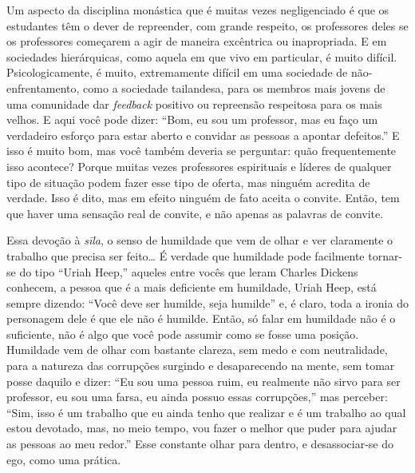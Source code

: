 Um aspecto da disciplina monástica que é muitas vezes negligenciado
é que os estudantes têm o dever de repreender, com grande respeito, os
professores deles se os professores começarem a agir de maneira
excêntrica ou inapropriada. E em sociedades hierárquicas, como aquela
em que vivo em particular, é muito difícil. Psicologicamente, é muito,
extremamente difícil em uma sociedade de não-enfrentamento, como a
sociedade tailandesa, para os membros mais jovens de uma comunidade dar
\emph{feedback} positivo ou repreensão respeitosa para os mais
velhos. E aqui você pode dizer: “Bom, eu sou um professor, mas eu faço
um verdadeiro esforço para estar aberto e convidar as pessoas a apontar
defeitos.” E isso é muito bom, mas você também deveria se perguntar:
quão frequentemente isso acontece? Porque muitas vezes professores
espirituais e líderes de qualquer tipo de situação podem fazer esse
tipo de oferta, mas ninguém acredita de verdade. Isso é dito, mas em
efeito ninguém de fato aceita o convite. Então, tem que haver uma
sensação real de convite, e não apenas as palavras de convite. 

Essa devoção à \emph{sīla}, o senso de humildade que vem de
olhar e ver claramente o trabalho que precisa ser feito\ldots{} É verdade que
humildade pode facilmente tornar-se do tipo “Uriah Heep,” aqueles entre
vocês que leram Charles Dickens conhecem, a pessoa que é a mais
deficiente em humildade, Uriah Heep, está sempre dizendo: “Você deve
ser humilde, seja humilde” e, é claro, toda a ironia do personagem dele
é que ele não é humilde. Então, só falar em humildade não é o
suficiente, não é algo que você pode assumir como se fosse uma posição.
Humildade vem de olhar com bastante clareza, sem medo e com
neutralidade, para a natureza das corrupções surgindo e desaparecendo
na mente, sem tomar posse daquilo e dizer: “Eu sou uma pessoa ruim, eu
realmente não sirvo para ser professor, eu sou uma farsa, eu ainda
possuo essas corrupções,” mas perceber: “Sim, isso é um trabalho que eu
ainda tenho que realizar e é um trabalho ao qual estou devotado, mas,
no meio tempo, vou fazer o melhor que puder para ajudar as pessoas ao
meu redor.” Esse constante olhar para dentro, e desassociar-se do ego,
como uma prática. 

